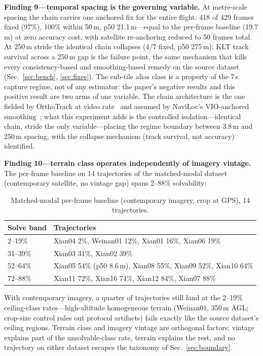 \documentclass[journal]{IEEEtran}
\begin{document}
\textbf{Finding 9---temporal spacing is the governing variable.} At metre-scale spacing the chain carries one anchored fix for the entire flight: 418 of 429 frames fixed (97\%), 100\% within 50\,m, p50 21.1\,m---equal to the per-frame baseline (19.7\,m) at zero accuracy cost, with satellite re-anchoring reduced to 50 frames total. At 250\,m stride the identical chain collapses (4/7 fixed, p50 275\,m): KLT track survival across a 250\,m gap is the failure point, the same mechanism that kills every consistency-based and smoothing-based remedy on the source dataset (Sec.~\ref{sec:bench}, \ref{sec:fixes}). The sub-tile alias class is a property of the 7\,s capture regime, not of any estimator: the paper's negative results and this positive result are two arms of one variable. The chain architecture is the one fielded by OrthoTrack at video rate~\cite{orthotrack} and assumed by NaviLoc's VIO-anchored smoothing~\cite{naviloc}; what this experiment adds is the controlled isolation---identical chain, stride the only variable---placing the regime boundary between 3.8\,m and 250\,m spacing, with the collapse mechanism (track survival, not accuracy) identified.

\textbf{Finding 10---terrain class operates independently of imagery vintage.} The per-frame baseline on 14 trajectories of the matched-modal dataset (contemporary satellite, no vintage gap) spans 2--88\% solvability:

\begin{table}[t]
\caption{Matched-modal per-frame baseline (contemporary imagery, crop at GPS), 14 trajectories.}
\label{tab:matchedmodal}
\centering
\footnotesize
\setlength{\tabcolsep}{3pt}
\begin{tabular}{@{}ll@{}}
\toprule
Solve band & Trajectories \\
\midrule
2--19\% & Xian04 2\%, Weinan01 12\%, Xian01 16\%, Xian06 19\% \\
31--39\% & Xian03 31\%, Xian02 39\% \\
52--64\% & Xian05 54\% (p50 8.6\,m), Xian08 55\%, Xian09 52\%, Xian10 64\% \\
72--88\% & Xian11 72\%, Xian16 74\%, Xian12 84\%, Xian07 88\% \\
\bottomrule
\end{tabular}
\end{table}

With contemporary imagery, a quarter of trajectories still land at the 2--19\% ceiling-class rates---high-altitude homogeneous terrain (Weinan01, 350\,m AGL; crop-size control rules out protocol artifacts) fails exactly like the source dataset's ceiling regions. Terrain class and imagery vintage are orthogonal factors: vintage explains part of the unsolvable-class rate, terrain explains the rest, and no trajectory on either dataset escapes the taxonomy of Sec.~\ref{sec:boundary}.
\end{document}
